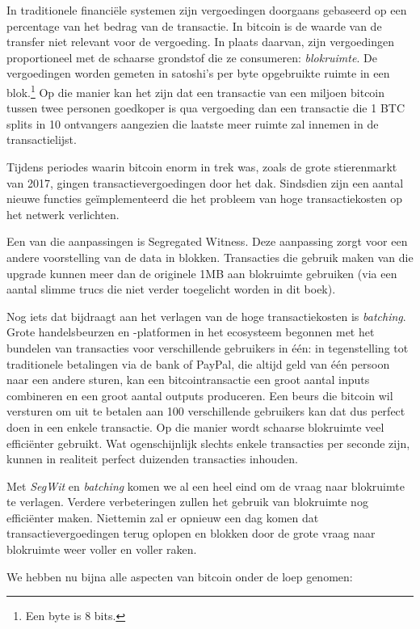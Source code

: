 In traditionele financiële systemen zijn vergoedingen doorgaans gebaseerd op een percentage van het bedrag van de transactie. In bitcoin is de waarde van de transfer niet relevant voor de vergoeding. In plaats daarvan, zijn vergoedingen proportioneel met de schaarse grondstof die ze consumeren: \textit{blokruimte}. De vergoedingen worden gemeten in satoshi’s per byte opgebruikte ruimte in een blok.\footnote{Een byte is 8 bits.} Op die manier kan het zijn dat een transactie van een miljoen bitcoin tussen twee personen goedkoper is qua vergoeding dan een transactie die 1 BTC splits in 10 ontvangers aangezien die laatste meer ruimte zal innemen in de transactielijst.

Tijdens periodes waarin bitcoin enorm in trek was, zoals de grote stierenmarkt van 2017, gingen transactievergoedingen door het dak. Sindsdien zijn een aantal nieuwe functies geïmplementeerd die het probleem van hoge transactiekosten op het netwerk verlichten.

Een van die aanpassingen is \textquotedbl{}Segregated Witness\textquotedbl{}. Deze aanpassing zorgt voor een andere voorstelling van de data in blokken. Transacties die gebruik maken van die upgrade kunnen meer dan de originele 1MB aan blokruimte gebruiken (via een aantal slimme trucs die niet verder toegelicht worden in dit boek).

Nog iets dat bijdraagt aan het verlagen van de hoge transactiekosten is \textit{batching}. Grote handelsbeurzen en -platformen in het ecosysteem begonnen met het bundelen van transacties voor verschillende gebruikers in één: in tegenstelling tot traditionele betalingen via de bank of PayPal, die altijd geld van één persoon naar een andere sturen, kan een bitcointransactie een groot aantal inputs combineren en een groot aantal outputs produceren. Een beurs die bitcoin wil versturen om uit te betalen aan 100 verschillende gebruikers kan dat dus perfect doen in een enkele transactie. Op die manier wordt schaarse blokruimte veel efficiënter gebruikt. Wat ogenschijnlijk slechts enkele transacties per seconde zijn, kunnen in realiteit perfect duizenden transacties inhouden.

Met \textit{SegWit} en \textit{batching} komen we al een heel eind om de vraag naar blokruimte te verlagen. Verdere verbeteringen zullen het gebruik van blokruimte nog efficiënter maken. Niettemin zal er opnieuw een dag komen dat transactievergoedingen terug oplopen en blokken door de grote vraag naar blokruimte weer voller en voller raken.

We hebben nu bijna alle aspecten van bitcoin onder de loep genomen:

